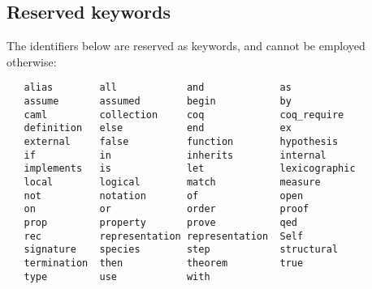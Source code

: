 \subsection{Reserved keywords}
The identifiers below are reserved as keywords, and cannot be employed
otherwise:
\begin{verbatim}
   alias        all            and             as
   assume       assumed        begin           by
   caml         collection     coq             coq_require
   definition   else           end             ex
   external     false          function        hypothesis
   if           in             inherits        internal
   implements   is             let             lexicographic
   local        logical        match           measure
   not          notation       of              open
   on           or             order           proof
   prop         property       prove           qed
   rec          representation representation  Self
   signature    species        step            structural
   termination  then           theorem         true
   type         use            with
\end{verbatim}



